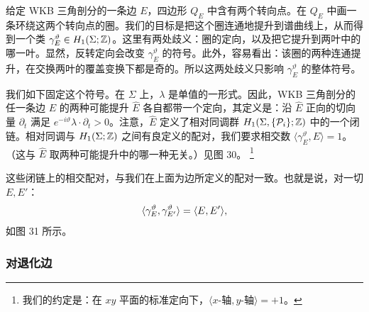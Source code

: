 
给定 WKB 三角剖分的一条边 $E$，四边形 $Q_E$ 中含有两个转向点。在 $Q_E$ 中画一条环绕这两个转向点的圈。我们的目标是把这个圈连通地提升到谱曲线上，从而得到一个类 $\gamma^\vartheta_E\in H_1(\Sigma;\mathbb{Z})$。这里有两处歧义：圈的定向，以及把它提升到两叶中的哪一叶。显然，反转定向会改变 $\gamma^\vartheta_E$ 的符号。此外，容易看出：该圈的两种连通提升，在交换两叶的覆盖变换下都是奇的。所以这两处歧义只影响 $\gamma^\vartheta_E$ 的整体符号。

我们如下固定这个符号。在 $\Sigma$ 上，$\lambda$ 是单值的一形式。因此，WKB 三角剖分的任一条边 $E$ 的两种可能提升 $\hat E$ 各自都带一个定向，其定义是：沿 $\hat E$ 正向的切向量 $\partial_t$ 满足 $e^{-i\vartheta}\lambda\cdot\partial_t>0$。注意，$\hat E$ 定义了相对同调群 $H_1(\Sigma,\{\mathcal{P}_i\};\mathbb{Z})$ 中的一个闭链。相对同调与 $H_1(\Sigma;\mathbb{Z})$ 之间有良定义的配对，我们要求相交数 $\langle\gamma^\vartheta_E,\hat E\rangle=1$。（这与 $\hat E$ 取两种可能提升中的哪一种无关。）见图 30。%
\footnote{我们的约定是：在 $xy$ 平面的标准定向下，$\langle x\text{-轴},y\text{-轴}\rangle=+1$。}

这些闭链上的相交配对，与我们在上面为边所定义的配对一致。也就是说，对一切 $E,E'$：
\begin{equation}\label{eq:intersection-pairing}
\langle \gamma^\vartheta_E, \gamma^\vartheta_{E'} \rangle = \langle E, E' \rangle,
\end{equation}
如图 31 所示。%

\subsubsection{对退化边}\label{sec:homology-degenerate}

